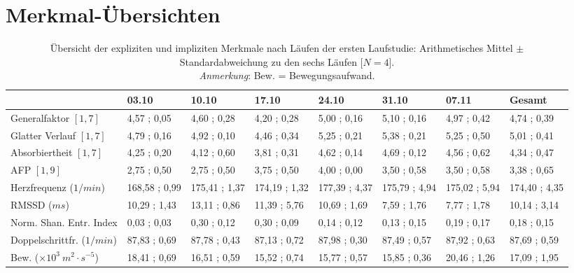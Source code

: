 \cleardoublepage

\section{Merkmal-Übersichten} 

\label{sec:merkmal_ubersichten} 
\begin{sidewaystable}
	\centering \caption[Übersicht der expliziten und impliziten Merkmale nach Läufen (Erste Studie: Laufen)]{Übersicht der expliziten und impliziten Merkmale nach Läufen der ersten Laufstudie: Arithmetisches Mittel $\pm$ Standardabweichung zu den sechs Läufen [$N = 4$]. \\
	\hspace{ 
	\textwidth}\emph{Anmerkung}: Bew. = Bewegungsaufwand.} \label{tab:ubersicht_nach_laufen_1} 
	\begin{tabular}
		{lyyyyyyy} \toprule & 03.10 & 10.10 & 17.10 & 24.10 & 31.10 & 07.11 & Gesamt \\
		\midrule Generalfaktor $[1{,} 7]$ & 4{,}57 ; 0{,}05 & 4{,}60 ; 0{,}28 & 4{,}20 ; 0{,}28 & 5{,}00 ; 0{,}16 & 5{,}10 ; 0{,}16 & 4{,}97 ; 0{,}42 & 4{,}74 ; 0{,}39 \\
		Glatter Verlauf $[1{,} 7]$ & 4{,}79 ; 0{,}16 & 4{,}92 ; 0{,}10 & 4{,}46 ; 0{,}34 & 5{,}25 ; 0{,}21 & 5{,}38 ; 0{,}21 & 5{,}25 ; 0{,}50 & 5{,}01 ; 0{,}41 \\
		Absorbiertheit $[1{,} 7]$ & 4{,}25 ; 0{,}20 & 4{,}12 ; 0{,}60 & 3{,}81 ; 0{,}31 & 4{,}62 ; 0{,}14 & 4{,}69 ; 0{,}12 & 4{,}56 ; 0{,}62 & 4{,}34 ; 0{,}47 \\
		\ac{AFP} $[1{,} 9]$ & 2{,}75 ; 0{,}50 & 2{,}75 ; 0{,}50 & 3{,}75 ; 0{,}50 & 4{,}00 ; 0{,}00 & 3{,}50 ; 0{,}58 & 3{,}50 ; 0{,}58 & 3{,}38 ; 0{,}65 \\
		Herzfrequenz ($1/min$) & 168{,}58 ; 0{,}99 & 175{,}41 ; 1{,}37 & 174{,}19 ; 1{,}32 & 177{,}39 ; 4{,}37 & 175{,}79 ; 4{,}94 & 175{,}02 ; 5{,}94 & 174{,}40 ; 4{,}35 \\
		\acs{RMSSD} ($ms$) & 10{,}29 ; 1{,}43 & 13{,}11 ; 0{,}86 & 11{,}39 ; 5{,}76 & 10{,}69 ; 1{,}69 & 7{,}59 ; 1{,}76 & 7{,}77 ; 1{,}78 & 10{,}14 ; 3{,}14 \\
		Norm. Shan. Entr. Index & 0{,}03 ; 0{,}03 & 0{,}30 ; 0{,}12 & 0{,}30 ; 0{,}09 & 0{,}14 ; 0{,}12 & 0{,}13 ; 0{,}15 & 0{,}19 ; 0{,}17 & 0{,}18 ; 0{,}15 \\
		Doppelschrittfr. ($1/min$) & 87,83 ; 0,69 & 87,78 ; 0,43 & 87,13 ; 0,72 & 87,98 ; 0,30 & 87,49 ; 0,57 & 87,92 ; 0,63 & 87,69 ; 0,59 \\
		Bew. ($\times 10^3 \: m^2 \cdot s^{-5}$) & 18{,}41 ; 0{,}69 & 16{,}51 ; 0{,}59 & 15{,}52 ; 0{,}74 & 15{,}77 ; 0{,}57 & 15{,}85 ; 0{,}36 & 20{,}46 ; 1{,}26 & 17{,}09 ; 1{,}95 \\
		\bottomrule 
	\end{tabular}
\end{sidewaystable}
